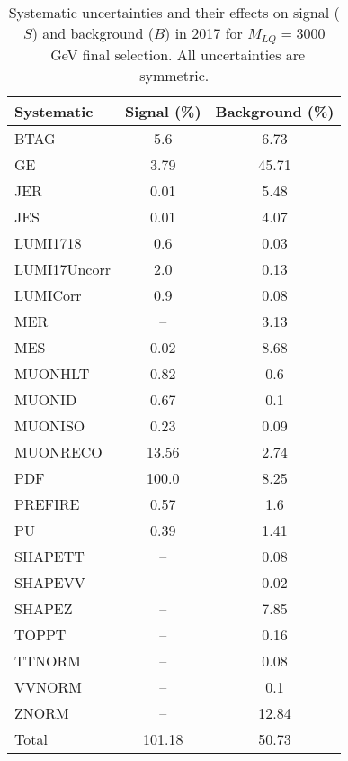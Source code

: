 \begin{table}[htbp]
\begin{center}
\caption{Systematic uncertainties and their effects on signal ($S$) and background ($B$) in 2017 for $M_{LQ}=3000$~GeV final selection. All uncertainties are symmetric.}
\begin{tabular}{lcc}
\hline\hline
Systematic & Signal (\%) & Background (\%) \\ \hline 
BTAG & 5.6 & 6.73\\ 
GE & 3.79 & 45.71\\ 
JER & 0.01 & 5.48\\ 
JES & 0.01 & 4.07\\ 
LUMI1718 & 0.6 & 0.03\\ 
LUMI17Uncorr & 2.0 & 0.13\\ 
LUMICorr & 0.9 & 0.08\\ 
MER & -- & 3.13\\ 
MES & 0.02 & 8.68\\ 
MUONHLT & 0.82 & 0.6\\ 
MUONID & 0.67 & 0.1\\ 
MUONISO & 0.23 & 0.09\\ 
MUONRECO & 13.56 & 2.74\\ 
PDF & 100.0 & 8.25\\ 
PREFIRE & 0.57 & 1.6\\ 
PU & 0.39 & 1.41\\ 
SHAPETT & -- & 0.08\\ 
SHAPEVV & -- & 0.02\\ 
SHAPEZ & -- & 7.85\\ 
TOPPT & -- & 0.16\\ 
TTNORM & -- & 0.08\\ 
VVNORM & -- & 0.1\\ 
ZNORM & -- & 12.84\\ 
Total & 101.18 & 50.73\\ \hline \hline
\end{tabular}
\label{tab:SysUncertainties_uujj_3000}
\end{center}
\end{table}

